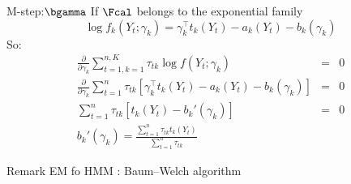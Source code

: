 \documentclass[compress,10pt]{beamer}
\begin{document}
\begin{frame}[allowframebreaks]{M-step:$\bgamma$}
If $\Fcal$ belongs to the exponential family
$$\log f_k(Y_t; \gamma_k) =  \gamma_k^\intercal  t_k(Y_t) - a_k(Y_t) - b_k(\gamma_k)$$
So: 
\begin{eqnarray*}
\frac{\partial }{ \partial \gamma_k}\sum_{t=1, k=1}^{n,K} {\tau_{tk} \log f(Y_t; \gamma_k)} &=& 0 \\
\frac{\partial }{ \partial \gamma_k} \sum_{t=1}^{n}  \tau_{tk}\left[ \gamma_k^\intercal  t_k(Y_t) - a_k(Y_t) - b_k(\gamma_k)\right]&=&0 \\
\sum_{t=1}^{n}  \tau_{tk} \left[t_k(Y_t) - b_k'(\gamma_k)\right]&=&0 \\
b_k'(\gamma_k) = \frac{\sum_{t=1}^{n}  \tau_{tk} t_k(Y_t) }{\sum_{t=1}^{n}  \tau_{tk} }&&
\end{eqnarray*}
\end{frame}

\begin{frame}[allowframebreaks]{Remark}
EM fo HMM : Baum–Welch algorithm

\end{frame}
\end{document}
